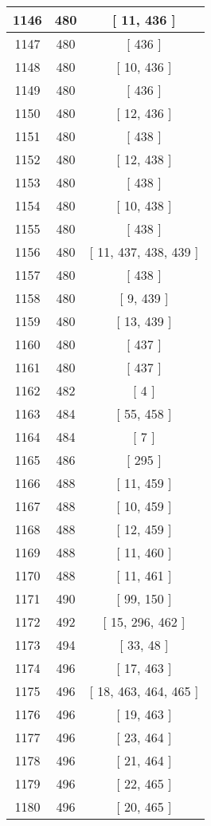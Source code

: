 \begin{center}
\begin{longtable}[H]{|| c c c ||}
\hline
1146 & 480 & [ 11, 436 ] \\ 
\hline
1147 & 480 & [ 436 ] \\ 
\hline
1148 & 480 & [ 10, 436 ] \\ 
\hline
1149 & 480 & [ 436 ] \\ 
\hline
1150 & 480 & [ 12, 436 ] \\ 
\hline
1151 & 480 & [ 438 ] \\ 
\hline
1152 & 480 & [ 12, 438 ] \\ 
\hline
1153 & 480 & [ 438 ] \\ 
\hline
1154 & 480 & [ 10, 438 ] \\ 
\hline
1155 & 480 & [ 438 ] \\ 
\hline
1156 & 480 & [ 11, 437, 438, 439 ] \\ 
\hline
1157 & 480 & [ 438 ] \\ 
\hline
1158 & 480 & [ 9, 439 ] \\ 
\hline
1159 & 480 & [ 13, 439 ] \\ 
\hline
1160 & 480 & [ 437 ] \\ 
\hline
1161 & 480 & [ 437 ] \\ 
\hline
1162 & 482 & [ 4 ] \\ 
\hline
1163 & 484 & [ 55, 458 ] \\ 
\hline
1164 & 484 & [ 7 ] \\ 
\hline
1165 & 486 & [ 295 ] \\ 
\hline
1166 & 488 & [ 11, 459 ] \\ 
\hline
1167 & 488 & [ 10, 459 ] \\ 
\hline
1168 & 488 & [ 12, 459 ] \\ 
\hline
1169 & 488 & [ 11, 460 ] \\ 
\hline
1170 & 488 & [ 11, 461 ] \\ 
\hline
1171 & 490 & [ 99, 150 ] \\ 
\hline
1172 & 492 & [ 15, 296, 462 ] \\ 
\hline
1173 & 494 & [ 33, 48 ] \\ 
\hline
1174 & 496 & [ 17, 463 ] \\ 
\hline
1175 & 496 & [ 18, 463, 464, 465 ] \\ 
\hline
1176 & 496 & [ 19, 463 ] \\ 
\hline
1177 & 496 & [ 23, 464 ] \\ 
\hline
1178 & 496 & [ 21, 464 ] \\ 
\hline
1179 & 496 & [ 22, 465 ] \\ 
\hline
1180 & 496 & [ 20, 465 ] \\ 

\end{longtable}
\end{center}
